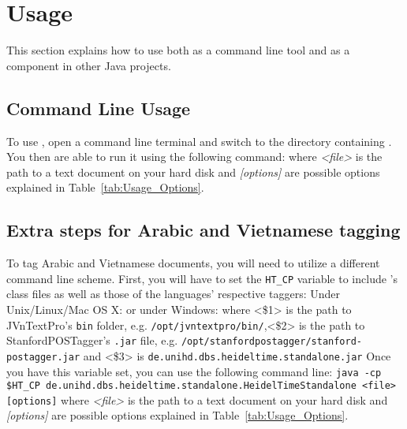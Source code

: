 \section{Usage}\label{sec:Usage}
This section explains how to use \product{} both as a command line tool and as a component in other Java projects.

\subsection{Command Line Usage}\label{sec:Usage_CommandLine}
To use \product{}, open a command line terminal and switch to the directory containing \executableFile{}. You then are able to run it using the following command:\newline {} where \emph{<file>} is the path to a text document on your hard disk and \emph{[options]} are possible options explained in Table~\ref{tab:Usage_Options}.
\subsection*{Extra steps for Arabic and Vietnamese tagging}
To tag Arabic and Vietnamese documents, you will need to utilize a different command line scheme. First, you will have to set the \texttt{HT\_CP} variable to include \product{}'s class files as well as those of the languages' respective taggers:\newline
\newline
Under Unix/Linux/Mac OS X: \newline
\indent {} \newline\newline
or under Windows: \newline
\indent {} \newline\newline
where \newline
<\$1> is the path to JVnTextPro's \texttt{bin} folder, e.g. \texttt{/opt/jvntextpro/bin/},\newline <\$2> is the path to StanfordPOSTagger's \texttt{.jar} file, e.g. \newline\texttt{/opt/stanfordpostagger/stanford-postagger.jar} and \newline
<\$3> is \texttt{de.unihd.dbs.heideltime.standalone.jar} \newline\newline
Once you have this variable set, you can use the following command line:\newline
\texttt{java -cp \$HT\_CP de.unihd.dbs.heideltime.standalone.HeidelTimeStandalone \newline <file> [options]}\newline
where \emph{<file>} is the path to a text document on your hard disk and \emph{[options]} are possible options explained in Table~\ref{tab:Usage_Options}.


